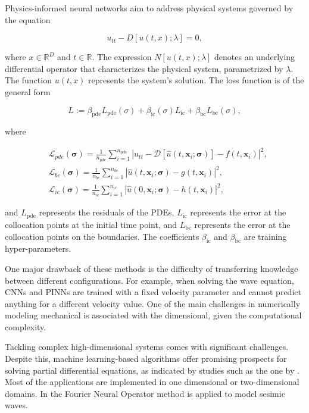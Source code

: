 \documentclass[11pt,twoside]{article}
\begin{document}
Physics-informed neural networks aim to address physical systems governed by the equation

$$
u_{tt} - D[u(t, x); \lambda] = 0,
$$

where \(x \in \mathbb{R}^D\) and \(t \in \mathbb{R}\). The expression \(N[u(t, x); \lambda]\) denotes 
an underlying differential operator that characterizes the physical system, parametrized by \(\lambda\). 
The function \(u(t, x)\) represents the system's solution. The loss function is of the general form 

$$ L := \beta_{\text{pde}}L_{\text{pde}}(\sigma) + \beta_{\text{ic}}(\sigma) L_{\text{ic}} + 
\beta_{\text{bc}} L_{\text{bc}}(\sigma) ,$$

where

$$
\begin{aligned}
& \mathcal{L}_{pde}(\boldsymbol{\sigma})=\frac{1}{n_{pde}} \sum_{i=1}^{n_{pde}}\left|u_{tt} - \mathcal{D}\left[\hat{u}\left(t,
 \boldsymbol{x}_i ; \boldsymbol{\sigma}\right)\right]-f\left(t, \boldsymbol{x}_i\right)\right|^2, \\
& \mathcal{L}_{bc}(\boldsymbol{\sigma})=\frac{1}{n_{bc}} \sum_{i=1}^{n_{bc}}\left|\hat{u}\left(t, \boldsymbol{x}_i ;
 \boldsymbol{\sigma}\right)-g\left(t, \boldsymbol{x}_i\right)\right|^2, \\
& \mathcal{L}_{ic}(\boldsymbol{\sigma})=\frac{1}{n_{ic}} \sum_{i=1}^{n_{ic}}\left|\hat{u}\left(0, \boldsymbol{x}_i ;
 \boldsymbol{\sigma}\right)-h\left(t,\boldsymbol{x}_i\right)\right|^2,
\end{aligned}
$$

and \( L_{\text{pde}} \) represents the residuals of the PDEs, \( L_{\text{ic}} \) represents the error at the collocation points at the 
initial time point, and \( L_{\text{bc}} \) represents the error at the collocation points on the boundaries. The coefficients 
\(\beta_{\text{ic}}\) and \(\beta_{\text{bc}}\) are training hyper-parameters.

One major drawback of these methods is the difficulty of transferring knowledge between different configurations. For example, when solving 
the wave equation, CNNs and PINNs are trained with a fixed velocity parameter and cannot predict anything for a different velocity value. 
One of the main challenges in numerically modeling mechanical is associated with the dimensional, given the computational complexity.

Tackling complex high-dimensional systems comes with significant challenges. Despite this, machine learning-based algorithms offer promising 
prospects for solving partial differential equations, as indicated by studies such as the one by . 
Most of the applications are implemented in one dimensional or two-dimensional domains. In  the Fourier 
Neural Operator method is applied to model sesimic waves.
\end{document}
